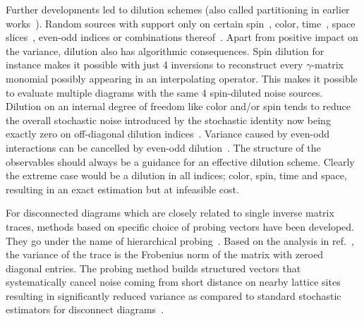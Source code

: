 Further developments led to dilution schemes (also called partitioning in earlier works~\cite{Wilcox:1999ab}).
Random sources with support only on certain spin~\cite{Wilcox:1997rm,Alexandrou:2010jr}, color, time~\cite{GUSKEN1989,OCais:2004xgm,Bali:2014pva}, space slices~\cite{Foley:2005ac}, even-odd indices or combinations thereof~\cite{Morningstar:2008mc,Bulava:2008qx,Foley:2010vv,Morningstar:2008ph}.
Apart from positive impact on the variance, dilution also has algorithmic consequences.
Spin dilution for instance makes it possible with just \num{4} inversions to reconstruct every $\gamma$-matrix monomial possibly appearing in an interpolating operator.
This makes it possible to evaluate multiple diagrams with the same \num{4} spin-diluted noise sources.
Dilution on an internal degree of freedom like color and/or spin tends to reduce the overall stochastic noise introduced by the stochastic identity now being exactly zero on off-diagonal dilution indices~\cite{Babich:2010at,Morningstar:2011ka}.
Variance caused by even-odd interactions can be cancelled by even-odd dilution~\cite{Bali_2009,Foley:2005ac,Morningstar:2011ka}.
The structure of the observables should always be a guidance for an effective dilution scheme.
Clearly the extreme case would be a dilution in all indices; color, spin, time and space, resulting in an exact estimation but at infeasible cost.

For disconnected diagrams which are closely related to single inverse matrix traces, methods based on specific choice of probing vectors have been developed.
They go under the name of hierarchical probing~\cite{tang2012probing,Stathopoulos:2013aci}.
Based on the analysis in ref.~\cite{Hutchinson01011990}, the variance of the trace is the Frobenius norm of the matrix with zeroed diagonal entries.
The probing method builds structured vectors that systematically cancel noise coming from short distance on nearby lattice sites resulting in significantly reduced variance as compared to standard stochastic estimators for disconnect diagrams~\cite{Stathopoulos:2013aci}.


